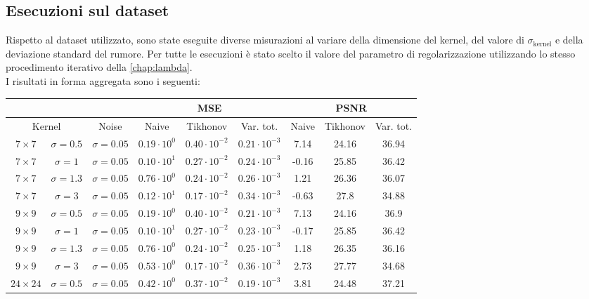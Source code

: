\documentclass[11pt]{article}
\begin{document}
\subsection{Esecuzioni sul dataset}
Rispetto al dataset utilizzato, sono state eseguite diverse misurazioni al variare della dimensione del kernel, del valore di $\sigma_{\text{kernel}}$ e della deviazione standard del rumore. 
Per tutte le esecuzioni è stato scelto il valore del parametro di regolarizzazione utilizzando lo stesso procedimento iterativo della \autoref{chap:lambda}.\\
I risultati in forma aggregata sono i seguenti:
\begin{center}
    \begin{tabular}{ |cc|c|c|c|c|c|c|c| }
    \hline
    & & & \multicolumn{3}{c|}{MSE} & \multicolumn{3}{c|}{PSNR} \\
    \hline
    \multicolumn{2}{|c|}{Kernel} & Noise & Naive & Tikhonov & Var. tot. & Naive & Tikhonov & Var. tot. \\ 
    \hline
	$7 \times 7$ & $\sigma=0.5$ & $\sigma=0.05$ & $0.19 \cdot 10^{0}$ & $0.40 \cdot 10^{-2}$ & $0.21 \cdot 10^{-3}$ & 7.14 & 24.16 & 36.94 \\
	$7 \times 7$ & $\sigma=1$ & $\sigma=0.05$ & $0.10 \cdot 10^{1}$ & $0.27 \cdot 10^{-2}$ & $0.24 \cdot 10^{-3}$ & -0.16 & 25.85 & 36.42 \\
    $7 \times 7$ & $\sigma=1.3$ & $\sigma=0.05$ & $0.76 \cdot 10^{0}$ & $0.24 \cdot 10^{-2}$ & $0.26 \cdot 10^{-3}$ & 1.21 & 26.36 & 36.07 \\
    $7 \times 7$ & $\sigma=3$ & $\sigma=0.05$ & $0.12 \cdot 10^{1}$ & $0.17 \cdot 10^{-2}$ & $0.34 \cdot 10^{-3}$ & -0.63 & 27.8 & 34.88 \\
	\hline
    $9 \times 9$ & $\sigma=0.5$ & $\sigma=0.05$ & $0.19 \cdot 10^{0}$ & $0.40 \cdot 10^{-2}$ & $0.21 \cdot 10^{-3}$ & 7.13 & 24.16 & 36.9 \\
	$9 \times 9$ & $\sigma=1$ & $\sigma=0.05$ & $0.10 \cdot 10^{1}$ & $0.27 \cdot 10^{-2}$ & $0.23 \cdot 10^{-3}$ & -0.17 & 25.85 & 36.42 \\
	$9 \times 9$ & $\sigma=1.3$ & $\sigma=0.05$ & $0.76 \cdot 10^{0}$ & $0.24 \cdot 10^{-2}$ & $0.25 \cdot 10^{-3}$ & 1.18 & 26.35 & 36.16 \\
    $9 \times 9$ & $\sigma=3$ & $\sigma=0.05$ & $0.53 \cdot 10^{0}$ & $0.17 \cdot 10^{-2}$ & $0.36 \cdot 10^{-3}$ & 2.73 & 27.77 & 34.68 \\
    \hline
    $24 \times 24$ & $\sigma=0.5$ & $\sigma=0.05$ & $0.42 \cdot 10^{0}$ & $0.37 \cdot 10^{-2}$ & $0.19 \cdot 10^{-3}$ & 3.81 & 24.48 & 37.21 \\

\end{tabular}
\end{center}
\end{document}
